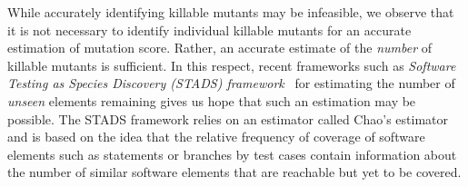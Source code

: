 \documentclass[sigconf,review,anonymous]{acmart}
\begin{document}
%

%
%
%
%


% 
While accurately identifying killable mutants may be infeasible, we observe that
it is not necessary to identify individual killable mutants for an accurate
estimation of mutation score. Rather, an accurate estimate of the
\emph{number} of killable mutants is sufficient. In this respect, recent
frameworks such as \emph{Software Testing as Species Discovery (STADS) framework}~\cite{bohme2018assurances}
for estimating the number of \emph{unseen} elements remaining
gives us hope that such an estimation may be possible.
The STADS framework relies on an estimator called Chao's estimator~\cite{chao2016species}
and is based on the idea
that the relative frequency of coverage of software
elements such as statements or branches by test cases contain information about
the number of similar software elements that are reachable but yet to be covered.
\end{document}
